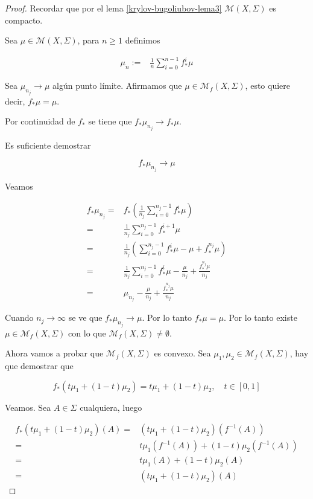\begin{proof}
	Recordar que por el lema \ref{krylov-bugoliubov-lema3} $\mathcal{M}(X,\Sigma)$ es compacto.
	
	Sea $\mu \in \mathcal{M}(X,\Sigma)$, para $n \geq 1$ definimos
	
	\begin{align}
		\mu_n :=& \frac{1}{n} \sum_{i=0}^{n-1} f_*^i \mu
	\end{align}
	
		Sea $\mu_{n_j} \rightarrow \mu$ algún punto límite. Afirmamos que $\mu \in \mathcal{M}_f(X,\Sigma)$, esto quiere decir, $f_*\mu = \mu$.
	
	Por continuidad de $f_*$ se tiene que $f_*\mu_{n_j} \rightarrow f_*\mu$.
	
	Es suficiente demostrar
	
	\begin{equation}
	f_*\mu_{n_j} \rightarrow \mu
	\end{equation}
	
	Veamos
	
	\begin{align}
	f_*\mu_{n_j} =& f_* \left( \frac{1}{n_j} \sum_{i=0}^{n_j-1} f^i_* \mu \right)\\
	=& \frac{1}{n_j} \sum_{i=0}^{n_j-1} f_*^{i+1} \mu\\
	=& \frac{1}{n_j} \left( \sum_{i=0}^{n_j-1} f^i_* \mu - \mu + f^{n_j}_* \mu \right)\\
	=& \frac{1}{n_j} \sum_{i=0}^{n_j-1} f^i_* \mu - \frac{\mu}{n_j} + \frac{f^{n_j}_* \mu}{n_j}\\
	=& \mu_{n_j} - \frac{\mu}{n_j} + \frac{f^{n_j}_* \mu}{n_j}
	\end{align}
	
	Cuando $n_j \rightarrow \infty$ se ve que $f_* \mu_{n_j} \rightarrow \mu$. Por lo tanto $f_*\mu=\mu$. Por lo tanto existe $\mu \in \mathcal{M}_f(X,\Sigma)$ con lo que $\mathcal{M}_f(X,\Sigma) \neq \emptyset$.
	
	Ahora vamos a probar que $\mathcal{M}_f(X,\Sigma)$ es convexo. Sea $\mu_1,\mu_2 \in \mathcal{M}_f(X,\Sigma)$, hay que demostrar que
	
	\begin{equation}
	f_*(t\mu_1 + (1-t)\mu_2) = t\mu_1 + (1-t)\mu_2, \quad t \in [0,1]
	\end{equation}
	
	Veamos. Sea $A \in \Sigma$ cualquiera, luego 
	
	\begin{align}
	f_*(t\mu_1 + (1-t)\mu_2)(A) =& (t\mu_1 + (1-t)\mu_2)(f^{-1}(A))\\
	=& t\mu_1(f^{-1}(A)) + (1-t)\mu_2(f^{-1}(A))\\
	=& t\mu_1(A) + (1-t)\mu_2(A)\\
	=& (t\mu_1 + (1-t)\mu_2)(A)
	\end{align}
	

\end{proof}
